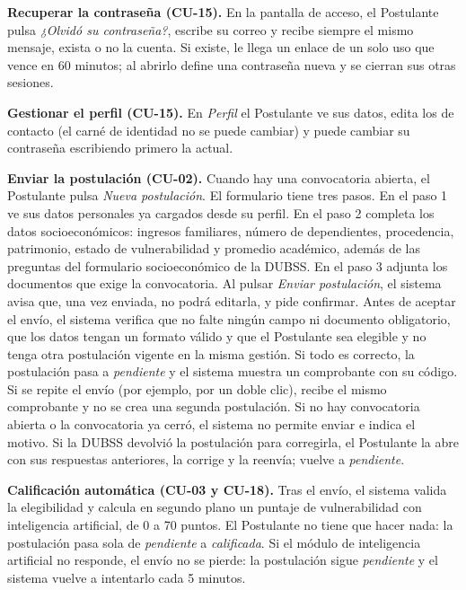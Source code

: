 \textbf{Recuperar la contraseña (CU-15).} En la pantalla de acceso, el Postulante pulsa \textit{¿Olvidó su contraseña?}, escribe su correo y recibe siempre el mismo mensaje, exista o no la cuenta. Si existe, le llega un enlace de un solo uso que vence en 60 minutos; al abrirlo define una contraseña nueva y se cierran sus otras sesiones.

\textbf{Gestionar el perfil (CU-15).} En \textit{Perfil} el Postulante ve sus datos, edita los de contacto (el carné de identidad no se puede cambiar) y puede cambiar su contraseña escribiendo primero la actual.

\textbf{Enviar la postulación (CU-02).} Cuando hay una convocatoria abierta, el Postulante pulsa \textit{Nueva postulación}. El formulario tiene tres pasos. En el paso 1 ve sus datos personales ya cargados desde su perfil. En el paso 2 completa los datos socioeconómicos: ingresos familiares, número de dependientes, procedencia, patrimonio, estado de vulnerabilidad y promedio académico, además de las preguntas del formulario socioeconómico de la DUBSS. En el paso 3 adjunta los documentos que exige la convocatoria. Al pulsar \textit{Enviar postulación}, el sistema avisa que, una vez enviada, no podrá editarla, y pide confirmar. Antes de aceptar el envío, el sistema verifica que no falte ningún campo ni documento obligatorio, que los datos tengan un formato válido y que el Postulante sea elegible y no tenga otra postulación vigente en la misma gestión. Si todo es correcto, la postulación pasa a \textit{pendiente} y el sistema muestra un comprobante con su código. Si se repite el envío (por ejemplo, por un doble clic), recibe el mismo comprobante y no se crea una segunda postulación. Si no hay convocatoria abierta o la convocatoria ya cerró, el sistema no permite enviar e indica el motivo. Si la DUBSS devolvió la postulación para corregirla, el Postulante la abre con sus respuestas anteriores, la corrige y la reenvía; vuelve a \textit{pendiente}.\par

\textbf{Calificación automática (CU-03 y CU-18).} Tras el envío, el sistema valida la elegibilidad y calcula en segundo plano un puntaje de vulnerabilidad con inteligencia artificial, de 0 a 70 puntos. El Postulante no tiene que hacer nada: la postulación pasa sola de \textit{pendiente} a \textit{calificada}. Si el módulo de inteligencia artificial no responde, el envío no se pierde: la postulación sigue \textit{pendiente} y el sistema vuelve a intentarlo cada 5 minutos.\par

